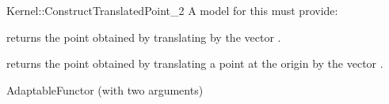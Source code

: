 \begin{ccRefFunctionObjectConcept}{Kernel::ConstructTranslatedPoint_2}
A model for this must provide:


       {returns the point obtained by translating  by the vector 
        .}

       {returns the point obtained by translating a point at the origin by the vector 
        .}

\ccRefines
AdaptableFunctor (with two arguments)

\ccSeeAlso
{}\\

\end{ccRefFunctionObjectConcept}
